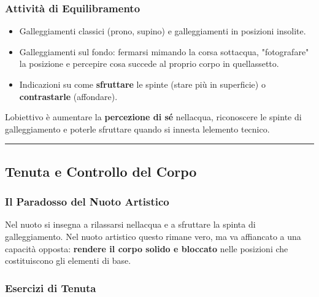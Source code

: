 \documentclass[a4paper,11pt]{article}
\providecommand{\tightlist}{%
  \setlength{\itemsep}{0pt}\setlength{\parskip}{0pt}}
\begin{document}
\subsubsection{Attività di
      Equilibramento}\label{attivituxe0-di-equilibramento}

\begin{itemize}
      \tightlist
      \item
            Galleggiamenti classici (prono, supino) e galleggiamenti in posizioni
            insolite.
      \item
            Galleggiamenti sul fondo: fermarsi mimando la corsa
            sott\textquotesingle acqua, "fotografare" la posizione e percepire
            cosa succede al proprio corpo in quell\textquotesingle assetto.
      \item
            Indicazioni su come \textbf{sfruttare} le spinte (stare più in
            superficie) o \textbf{contrastarle} (affondare).
\end{itemize}

L\textquotesingle obiettivo è aumentare la \textbf{percezione di sé}
nell\textquotesingle acqua, riconoscere le spinte di galleggiamento e
poterle sfruttare quando si innesta l\textquotesingle elemento tecnico.

\begin{center}\rule{0.5\linewidth}{0.5pt}\end{center}

\subsection{Tenuta e Controllo del
      Corpo}\label{tenuta-e-controllo-del-corpo}

\subsubsection{Il Paradosso del Nuoto
      Artistico}\label{il-paradosso-del-nuoto-artistico}

Nel nuoto si insegna a rilassarsi nell\textquotesingle acqua e a
sfruttare la spinta di galleggiamento. Nel nuoto artistico questo rimane
vero, ma va affiancato a una capacità opposta: \textbf{rendere il corpo
      solido e bloccato} nelle posizioni che costituiscono gli elementi di
base.

\subsubsection{Esercizi di Tenuta}\label{esercizi-di-tenuta}
\end{document}
